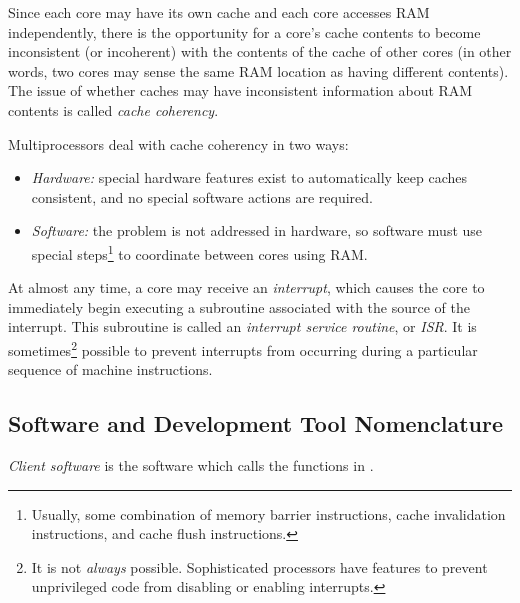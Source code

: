 Since each core may have its own cache and each core 
accesses RAM independently, there is the opportunity for a 
core's cache contents to become inconsistent (or incoherent) 
with the contents of the cache of other cores (in other 
words, two cores may sense the same RAM location as having 
different contents).  The issue of whether caches may have 
inconsistent information about RAM contents is called 
\emph{cache coherency}.  

Multiprocessors deal with cache coherency in two ways:

\begin{itemize}
\item \emph{Hardware:} special hardware features exist to
      automatically keep caches consistent, and no
      special software actions are required.  
\item \emph{Software:} the problem is not addressed in
      hardware, so software must use special
      steps\footnote{Usually, some combination of 
      memory barrier instructions, cache invalidation
      instructions, and cache flush instructions.} to
      coordinate between cores using RAM.  
\end{itemize}

At almost any time, a core may receive an 
\emph{interrupt}, which causes the core to 
immediately begin executing a subroutine associated with the 
source of the interrupt.  This subroutine is called an 
\emph{interrupt 
service routine}, or \emph{ISR}\@.  It is 
sometimes\footnote{It is not \emph{always} possible.  
Sophisticated processors have features to prevent 
unprivileged code from disabling or enabling interrupts.} 
possible to prevent interrupts from occurring during a 
particular sequence of machine instructions.  


\subsection{Software and Development Tool Nomenclature}
\label{ciov0:snom0:sdvt0}

\emph{Client software} is the 
software which calls the functions in 
\emph{\productbasenameshort{}}.  

